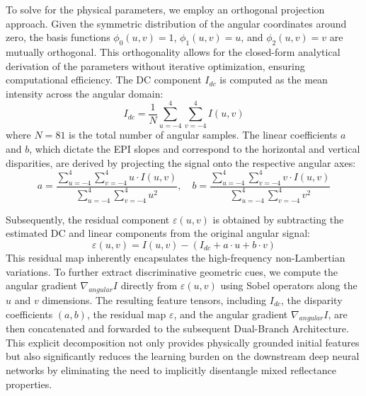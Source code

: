 To solve for the physical parameters, we employ an orthogonal projection approach. Given the symmetric distribution of the angular coordinates around zero, the basis functions $\phi_0(u,v) = 1$, $\phi_1(u,v) = u$, and $\phi_2(u,v) = v$ are mutually orthogonal. This orthogonality allows for the closed-form analytical derivation of the parameters without iterative optimization, ensuring computational efficiency. The DC component $I_{dc}$ is computed as the mean intensity across the angular domain:
\begin{equation}
\label{eq:eq6}
I_{dc} = \frac{1}{N} \sum_{u=-4}^{4} \sum_{v=-4}^{4} I(u,v)
\end{equation}
where $N = 81$ is the total number of angular samples. The linear coefficients $a$ and $b$, which dictate the EPI slopes and correspond to the horizontal and vertical disparities, are derived by projecting the signal onto the respective angular axes:
\begin{equation}
\label{eq:eq7}
a = \frac{\sum_{u=-4}^{4} \sum_{v=-4}^{4} u \cdot I(u,v)}{\sum_{u=-4}^{4} \sum_{v=-4}^{4} u^2}, \quad b = \frac{\sum_{u=-4}^{4} \sum_{v=-4}^{4} v \cdot I(u,v)}{\sum_{u=-4}^{4} \sum_{v=-4}^{4} v^2}
\end{equation}

Subsequently, the residual component $\varepsilon(u,v)$ is obtained by subtracting the estimated DC and linear components from the original angular signal:
\begin{equation}
\label{eq:eq8}
\varepsilon(u,v) = I(u,v) - \left( I_{dc} + a \cdot u + b \cdot v \right)
\end{equation}
This residual map inherently encapsulates the high-frequency non-Lambertian variations. To further extract discriminative geometric cues, we compute the angular gradient $\nabla_{angular} I$ directly from $\varepsilon(u,v)$ using Sobel operators along the $u$ and $v$ dimensions. The resulting feature tensors, including $I_{dc}$, the disparity coefficients $(a, b)$, the residual map $\varepsilon$, and the angular gradient $\nabla_{angular} I$, are then concatenated and forwarded to the subsequent Dual-Branch Architecture. This explicit decomposition not only provides physically grounded initial features but also significantly reduces the learning burden on the downstream deep neural networks by eliminating the need to implicitly disentangle mixed reflectance properties.
